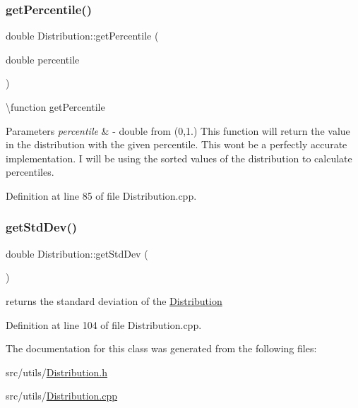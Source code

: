 \subsubsection{\texorpdfstring{getPercentile()}{getPercentile()}}
{\footnotesize\ttfamily double Distribution\+::get\+Percentile (\begin{DoxyParamCaption}\item[{double}]{percentile }\end{DoxyParamCaption})}

\textbackslash{}function get\+Percentile 
\begin{DoxyParams}{Parameters}
{\em percentile} & -\/ double from (0,1.) This function will return the value in the distribution with the given percentile. This won\textquotesingle{}t be a perfectly accurate implementation. I will be using the sorted values of the distribution to calculate percentiles. \\
\hline
\end{DoxyParams}


Definition at line 85 of file Distribution.\+cpp.

\mbox{\label{class_world_architect_1_1_distribution_a835105360b0c7da1a0eec0943963f0d7}} 
\subsubsection{\texorpdfstring{getStdDev()}{getStdDev()}}
{\footnotesize\ttfamily double Distribution\+::get\+Std\+Dev (\begin{DoxyParamCaption}{ }\end{DoxyParamCaption})}



returns the standard deviation of the \mbox{\hyperlink{class_world_architect_1_1_distribution}{Distribution}} 



Definition at line 104 of file Distribution.\+cpp.



The documentation for this class was generated from the following files\+:\begin{DoxyCompactItemize}
\item 
src/utils/\mbox{\hyperlink{_distribution_8h}{Distribution.\+h}}\item 
src/utils/\mbox{\hyperlink{_distribution_8cpp}{Distribution.\+cpp}}\end{DoxyCompactItemize}
